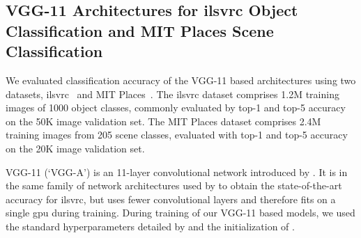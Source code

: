 \documentclass[thesis]{subfiles}
\begin{document}
    \subsection[VGG-11 Architectures for \acrshort{ilsvrc} Object Classification and MIT Places Scene Classification]{VGG-11 Architectures for \acrshort{ilsvrc} Object\\Classification and MIT Places Scene Classification}\label{vggresults}
    We evaluated classification accuracy of the VGG-11 based architectures using two datasets, \gls{ilsvrc}~\citep{Jia2014} and MIT Places~\citep{zhou2014learning}. The \gls{ilsvrc} dataset comprises 1.2M training images of 1000 object classes, commonly evaluated by top-1 and top-5 accuracy on the 50K image validation set. The MIT Places dataset comprises 2.4M training images from 205 scene classes, evaluated with top-1 and top-5 accuracy on the 20K image validation set.
    
    VGG-11 (`VGG-A') is an 11-layer convolutional network introduced by \citet{Simonyan2014verydeep}. It is in the same family of network architectures used by \citet{Simonyan2014verydeep,He2015b} to obtain the state-of-the-art accuracy for \gls{ilsvrc}, but uses fewer convolutional layers and therefore fits on a single \gls{gpu} during training. During training of our VGG-11 based models, we used the standard hyperparameters detailed by \citet{Simonyan2014verydeep} and the initialization of \citet{He2015b}.
    
\end{document}
